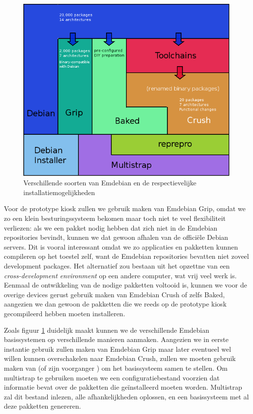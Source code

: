 \begin{figure}
	\includegraphics[width=\textwidth]{afbeeldingen/emdebian_soorten}
	\caption{Verschillende soorten van Emdebian en de respectievelijke installatiemogelijkheden}
	\label{fig:emdebian:flavours}
\end{figure}

Voor de prototype kiosk zullen we gebruik maken van Emdebian Grip, omdat we zo een klein besturingssysteem bekomen maar toch niet te veel flexibiliteit verliezen: als we een pakket nodig hebben dat zich niet in de Emdebian repositories bevindt, kunnen we dat gewoon afhalen van de officiële Debian servers. Dit is vooral interessant omdat we zo applicaties en pakketten kunnen compileren op het toestel zelf, want de Emdebian repositories bevatten niet zoveel development packages. Het alternatief zou bestaan uit het opzettne van een \emph{cross-development environment} op een andere computer, wat vrij veel werk is.
Eenmaal de ontwikkeling van de nodige pakketten voltooid is, kunnen we voor de overige devices gerust gebruik maken van Emdebian Crush of zelfs Baked, aangezien we dan gewoon de pakketten die we reeds op de prototype kiosk gecompileerd hebben moeten installeren.

Zoals figuur \ref{fig:emdebian:flavours} duidelijk maakt kunnen we de verschillende Emdebian basissystemen op verschillende manieren aanmaken. Aangezien we in eerste instantie gebruik zullen maken van Emdebian Grip maar later eventueel wel willen kunnen overschakelen naar Emdebian Crush, zullen we moeten gebruik maken van  (of zijn voorganger ) om het basissysteem samen te stellen. Om multistrap te gebruiken moeten we een configuratiebestand voorzien dat informatie bevat over de pakketten die geïnstalleerd moeten worden. Multistrap zal dit bestand inlezen, alle afhankelijkheden oplossen, en een basissysteem met al deze pakketten genereren.

